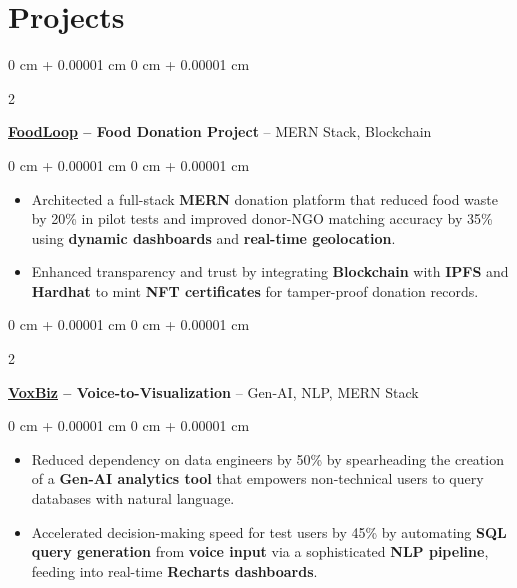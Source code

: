 \documentclass[10pt, letterpaper]{article}
\newenvironment{highlights}{
    \begin{itemize}[
        topsep=0.10 cm,
        parsep=0.10 cm,
        partopsep=0pt,
        itemsep=0pt,
        leftmargin=0 cm + 10pt
    ]
}{
    \end{itemize}
} %
\newenvironment{onecolentry}{
    \begin{adjustwidth}{
        0 cm + 0.00001 cm
    }{
        0 cm + 0.00001 cm
    }
}{
    \end{adjustwidth}
} %
\newenvironment{twocolentry}[2][]{
    \onecolentry
    \def\secondColumn{#2}
    \setcolumnwidth{\fill, 4.5 cm}
    \begin{paracol}{2}
}{
    \switchcolumn \raggedleft \secondColumn
    \end{paracol}
    \endonecolentry
} %
\begin{document}
    \section{Projects}

      \begin{twocolentry}{
    \href{https://github.com/ritheshan/FoodLoop}{\faGithub}
}
    \textbf{\href{https://food-loop-123.vercel.app}{\underline{\textcolor{blueHighlight}{\large FoodLoop}}} – Food Donation Project} -- {MERN Stack}, {Blockchain}
\end{twocolentry}

\vspace{0.10 cm}
\begin{onecolentry}
    \begin{highlights}
        \item Architected a full-stack \textbf{MERN} donation platform that reduced food waste by 20\% in pilot tests and improved donor-NGO matching accuracy by 35\% using \textbf{dynamic dashboards} and \textbf{real-time geolocation}.  
        \item Enhanced transparency and trust by integrating \textbf{Blockchain} with \textbf{IPFS} and \textbf{Hardhat} to mint \textbf{NFT certificates} for tamper-proof donation records.  
    \end{highlights}
\end{onecolentry}
        \vspace{0.2 cm}

        \begin{twocolentry}{
    \href{https://github.com/ritheshan/VoxBiz}{\faGithub}
}
    \textbf{\href{https://voxbiz.vercel.app/}{\underline{\textcolor{blueHighlight}{\large VoxBiz}}} – Voice-to-Visualization} -- {Gen-AI}, {NLP}, {MERN Stack}
\end{twocolentry}

\vspace{0.10 cm}
\begin{onecolentry}
    \begin{highlights}
        \item Reduced dependency on data engineers by 50\% by spearheading the creation of a \textbf{Gen-AI analytics tool} that empowers non-technical users to query databases with natural language.
        \item Accelerated decision-making speed for test users by 45\% by automating \textbf{SQL query generation} from \textbf{voice input} via a sophisticated \textbf{NLP pipeline}, feeding into real-time \textbf{Recharts dashboards}.
    \end{highlights}
\end{onecolentry}
\end{document}
